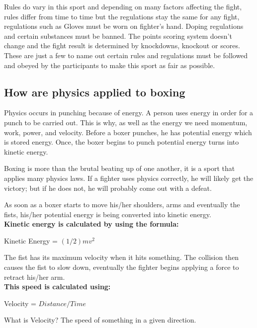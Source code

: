 \documentclass[a4paper,12pt]{report}
\begin{document}
Rules do vary in this sport and depending on many factors affecting the fight, rules differ from time to time but the regulations stay the same for any fight, regulations such as
Gloves must be worn on fighter's hand.
Doping regulations and certain substances must be banned.
The points scoring system doesn't change and the fight result is determined by knockdowns, knockout or scores.
These are just a few to name out certain rules and regulations must be followed and obeyed by the participants to make this sport as fair as possible. 

\subsection{How are physics applied to boxing}
Physics occurs in punching because of energy. A person uses energy in order for a punch to be carried out. This is why, as well as the energy we need momentum, work, power, and velocity. Before a boxer punches, he has potential energy which is stored energy. Once, the boxer begins to punch potential energy turns into kinetic energy.

Boxing is more than the brutal beating up of one another, it is a sport that applies many physics laws. If a fighter uses physics correctly, he will likely get the victory; but if he does not, he will probably come out with a defeat.

As soon as a boxer starts to move his/her shoulders, arms and eventually the fists, his/her potential energy is being converted into kinetic energy.\\

\textbf{Kinetic energy is calculated by using the formula:}

    Kinetic Energy = $(1/2)mv^2$

The fist has its maximum velocity when it hits something. The collision then causes the fist to slow down, eventually the fighter begins applying a force to retract his/her arm.\\

\textbf{This speed is calculated using:}

Velocity = $Distance / Time$

What is Velocity? The speed of something in a given direction.\cite{boxPhysics}
\end{document}
